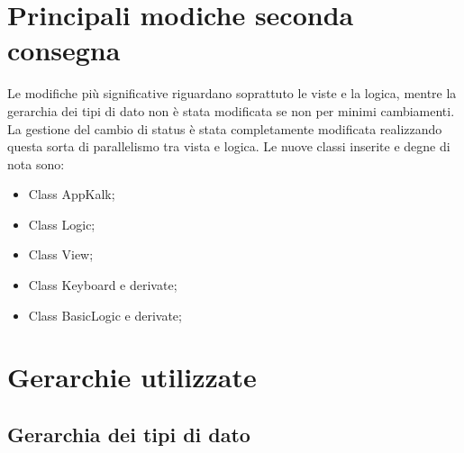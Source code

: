 \documentclass[a4paper,10pt]{article}
\begin{document}
    \section{Principali modiche seconda consegna}
    Le modifiche più significative riguardano soprattuto le viste e la logica, mentre la gerarchia dei tipi di dato non è stata modificata se non per minimi cambiamenti.
    La gestione del cambio di status è stata completamente modificata realizzando questa sorta di parallelismo tra vista e logica.
    Le nuove classi inserite e degne di nota sono:
    \begin{itemize}
        \item Class AppKalk;
        \item Class Logic;
        \item Class View;
        \item Class Keyboard e derivate;
        \item Class BasicLogic e derivate;
    \end{itemize}

	\section{Gerarchie utilizzate}
	\subsection{Gerarchia dei tipi di dato}
\end{document}
